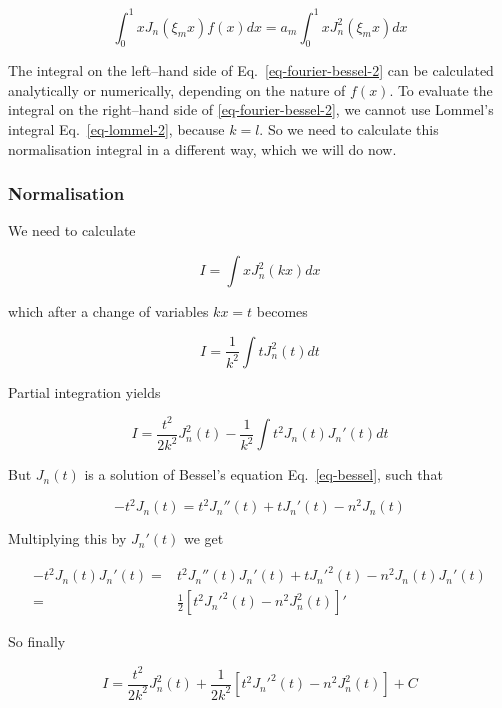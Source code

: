 \begin{equation}
\int_0^1 x J_n(\xi_m x) f(x) dx = a_m \int_0^1 x J_n^2(\xi_m x) dx \label{eq-fourier-bessel-2}
\end{equation} 

The integral on the left--hand side of Eq.~\ref{eq-fourier-bessel-2} can be calculated analytically or numerically, depending on the nature of $f(x)$. To evaluate the integral on the right--hand side of \ref{eq-fourier-bessel-2}, we cannot use Lommel's integral Eq.~\ref{eq-lommel-2}, because $k=l$. So we need to calculate this normalisation integral in a different way, which we will do now.

\subsubsection{Normalisation}

We need to calculate

\begin{equation}
I = \int x J_n^2(k x) dx
\end{equation}

which after a change of variables $kx = t$ becomes

\begin{equation}
I = \frac{1}{k^2} \int t J_n^2(t) dt
\end{equation}

Partial integration yields

\begin{equation}
I = \frac{t^2}{2 k^2}J_n^2(t) - \frac{1}{k^2} \int t^2 J_n(t) J_n'(t) dt
\end{equation} 

But $J_n(t)$ is a solution of Bessel's equation Eq.~\ref{eq-bessel}, such that

\begin{equation} 
- t^2 J_n(t) = t^2 J_n''(t) + t J_n'(t) - n^2 J_n(t)
\end{equation}

Multiplying this by $J_n'(t)$ we get

\begin{align} 
- t^2 J_n(t) J_n'(t) = & t^2 J_n''(t)J_n'(t) + t J_n'^2(t) - n^2 J_n(t)J_n'(t) \nonumber \\
 = & \frac{1}{2} \left[{t^2 J_n'^2(t) - n^2 J_n^2(t)}\right]'
\end{align}

So finally

\begin{equation}
I = \frac{t^2}{2 k^2}J_n^2(t) + \frac{1}{2 k^2} \left[{t^2 J_n'^2(t) - n^2 J_n^2(t)}\right] + C
\end{equation} 

